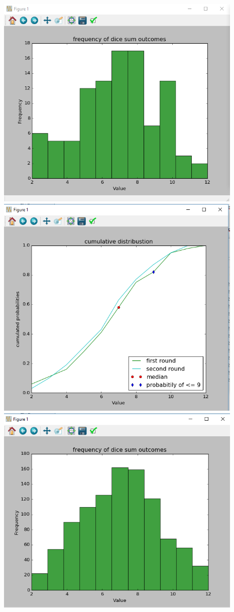 \documentclass{WeSTassignment}
\begin{document}
\includegraphics[width=450px]{hist1}
\label{histogram for n = 100}
\includegraphics[width=450px]{cdf1}
\label{CDF plot with 2 rounds for n = 100}
\includegraphics[width=450px]{hist2}
\end{document}
